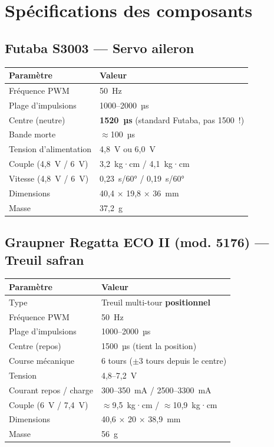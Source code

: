 \documentclass[12pt,a4paper]{article}
\begin{document}
\appendix
\section{Spécifications des composants}

\subsection{Futaba S3003 — Servo aileron}

\begin{longtable}{L{5cm} L{7cm}}
  \toprule
  \textcolor{tableheadfg}{\textbf{Paramètre}} &
  \textcolor{tableheadfg}{\textbf{Valeur}} \\
  \midrule
  \endhead
  \bottomrule
  \endfoot
  Fréquence PWM & 50~Hz \\[3pt]
  Plage d'impulsions & 1000--2000~µs \\[3pt]
  Centre (neutre) & \textbf{1520~µs} (standard Futaba, pas 1500~!) \\[3pt]
  Bande morte & $\approx$100~µs \\[3pt]
  Tension d'alimentation & 4,8~V ou 6,0~V \\[3pt]
  Couple (4,8~V / 6~V) & 3,2~kg·cm / 4,1~kg·cm \\[3pt]
  Vitesse (4,8~V / 6~V) & 0,23~s/60° / 0,19~s/60° \\[3pt]
  Dimensions & 40,4 × 19,8 × 36~mm \\[3pt]
  Masse & 37,2~g \\
\end{longtable}

\subsection{Graupner Regatta ECO II (mod. 5176) — Treuil safran}

\begin{longtable}{L{5cm} L{7cm}}
  \toprule
  \textcolor{tableheadfg}{\textbf{Paramètre}} &
  \textcolor{tableheadfg}{\textbf{Valeur}} \\
  \midrule
  \endhead
  \bottomrule
  \endfoot
  Type & Treuil multi-tour \textbf{positionnel} \\[3pt]
  Fréquence PWM & 50~Hz \\[3pt]
  Plage d'impulsions & 1000--2000~µs \\[3pt]
  Centre (repos) & 1500~µs (tient la position) \\[3pt]
  Course mécanique & 6 tours ($\pm$3 tours depuis le centre) \\[3pt]
  Tension & 4,8--7,2~V \\[3pt]
  Courant repos / charge & 300--350~mA / 2500--3300~mA \\[3pt]
  Couple (6~V / 7,4~V) & $\approx$9,5~kg·cm / $\approx$10,9~kg·cm \\[3pt]
  Dimensions & 40,6 × 20 × 38,9~mm \\[3pt]
  Masse & 56~g \\
\end{longtable}
\end{document}
